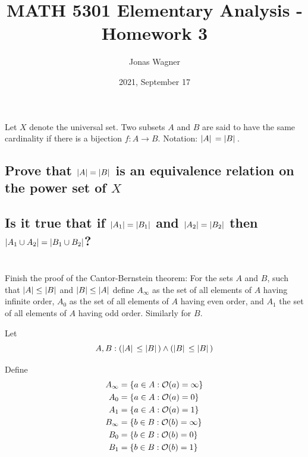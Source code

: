\documentclass[]{article}
\title{MATH 5301 Elementary Analysis - Homework 3}
\author{Jonas Wagner}
\date{2021, September 17}
\begin{document}
\maketitle

\section{}
Let $X$ denote the universal set. Two subsets $A$ and $B$ are said to have 
the same cardinality if there is a bijection $f : A \rightarrow B$.
Notation: $\abs*{A} = \abs*{B}$.

\subsection{
	Prove that $\abs{A} = \abs{B}$ is an equivalence relation on the power set of $X$
}




 


\subsection{
	Is it true that if $\abs{A_1}=\abs{B_1}$ and $\abs{A_2}=\abs{B_2}$ 
	then $\abs{A_1 \cup A_2} = \abs{B_1 \cup B_2}$?
}




\newpage
\section{}
Finish the proof of the Cantor-Bernstein theorem:
For the sets $A$ and $B$, such that $\abs{A} \leq \abs{B}$ and $\abs{B} \leq \abs{A}$
define $A_\infty$ as the set of all elements of $A$ having infinite order,
$A_0$ as the set of all elements of $A$ having even order,
and $A_1$ the set of all elements of $A$ having odd order. Similarly for $B$.


Let
$$A,B : (\abs*{A} \leq \abs*{B}) \land (\abs*{B} \leq \abs*{B})$$

Define
\begin{align*}
	A_\infty &= \{a \in A : \order*{a} = \infty\}\\
	A_0 &= \{a \in A : \order*{a} = 0\}\\
	A_1 &= \{a \in A : \order*{a} = 1\}\\
	B_\infty &= \{b \in B : \order*{b} = \infty\}\\
	B_0 &= \{b \in B : \order*{b} = 0\}\\
	B_1 &= \{b \in B : \order*{b} = 1\}\\
\end{align*}
\end{document}
